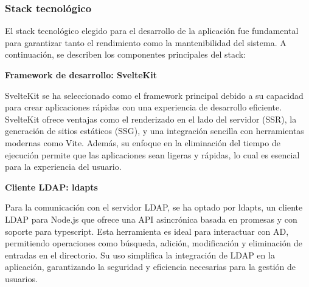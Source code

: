 \subsubsection{Stack tecnológico}

El stack tecnológico elegido para el desarrollo de la aplicación fue fundamental para garantizar tanto el rendimiento como la mantenibilidad del sistema. A continuación, se describen los componentes principales del stack:


\textbf{Framework de desarrollo: SvelteKit}

SvelteKit se ha seleccionado como el framework principal debido a su capacidad para crear aplicaciones rápidas con una experiencia de desarrollo eficiente. SvelteKit ofrece ventajas como el renderizado en el lado del servidor (SSR), la generación de sitios estáticos (SSG), y una integración sencilla con herramientas modernas como Vite. Además, su enfoque en la eliminación del tiempo de ejecución permite que las aplicaciones sean ligeras y rápidas, lo cual es esencial para la experiencia del usuario.

\textbf{Cliente LDAP: ldapts}

Para la comunicación con el servidor LDAP, se ha optado por ldapts, un cliente LDAP para Node.js que ofrece una API asincrónica basada en promesas y con soporte para typescript. Esta herramienta es ideal para interactuar con AD, permitiendo operaciones como búsqueda, adición, modificación y eliminación de entradas en el directorio. Su uso simplifica la integración de LDAP en la aplicación, garantizando la seguridad y eficiencia necesarias para la gestión de usuarios.
